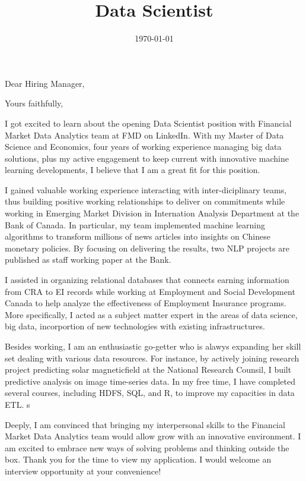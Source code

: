 \documentclass[12pt,a4paper,roman]{moderncv}        %
\title{Data Scientist\vspace*{15pt}}                               %
\begin{document}

\date{\today}
\opening{Dear Hiring Manager,}
\closing{Yours faithfully,}

\makelettertitle

I got excited to learn about the opening Data Scientist position with Financial Market Data Analytics team at FMD on LinkedIn. With my Master of Data Science and Economics, four years of working experience managing big data solutions, plus my active engagement to keep current with innovative machine learning developments, I believe that I am a great fit for this position. 
\bigskip

I gained valuable working experience interacting with inter-diciplinary teams, thus building positive working relationships to deliver on commitments while working in Emerging Market Division in Internation Analysis Department at the Bank of Canada. In particular, my team implemented machine learning algorithms to transform millions of news articles into insights on Chinese monetary policies. By focusing on delivering the results, two NLP projects are published as staff working paper at the Bank.  
\bigskip

I assisted in organizing relational databases that connects earning information from CRA to EI records while working at Employment and Social Development Canada to help analyze the effectiveness of Employment Insurance programs. More specifically, I acted as a subject matter expert in the areas of data science,  big data, incorportion of new technologies with existing infrastructures. 
\bigskip 

Besides working, I am an enthusiastic go-getter who is alawys expanding her skill set dealing with various data resources. For instance, by actively joining research project predicting solar magneticfield at the National Research Counsil, I built predictive analysis on image time-series data. In my free time, I have completed several courses, including HDFS, SQL, and R, to improve my capacities in data ETL. s
\bigskip

Deeply, I am convinced that bringing my interpersonal skills to the Financial Market Data Analytics team would allow grow with an innovative environment. I am excited to embrace new ways of solving problems and thinking outside the box. Thank you for the time to view my application. I would welcome an interview opportunity at your convenience!
\bigskip

\makeletterclosing
\end{document}
